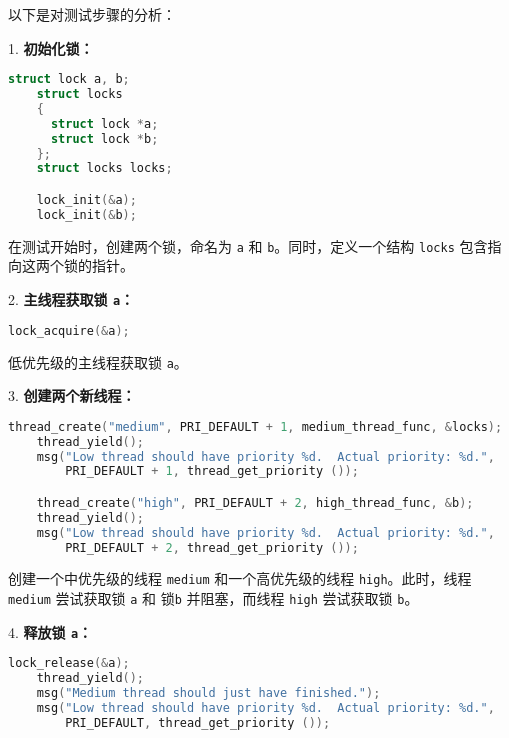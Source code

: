 \documentclass{beamer}
\begin{document}
\begin{frame}
    
    
    
    
  \framebreak

  以下是对测试步骤的分析：

  1. \textbf{初始化锁：}
  \begin{lstlisting}[language=C]
    struct lock a, b;
    struct locks 
    {
      struct lock *a;
      struct lock *b;
    };
    struct locks locks;

    lock_init(&a);
    lock_init(&b);
\end{lstlisting}

  在测试开始时，创建两个锁，命名为 \texttt{a} 和 \texttt{b}。同时，定义一个结构 \texttt{locks} 包含指向这两个锁的指针。

  2. \textbf{主线程获取锁 \texttt{a}：}
  \begin{lstlisting}[language=C]
    lock_acquire(&a);
\end{lstlisting}

  低优先级的主线程获取锁 \texttt{a}。

  3. \textbf{创建两个新线程：}
  \begin{lstlisting}[language=C]
    thread_create("medium", PRI_DEFAULT + 1, medium_thread_func, &locks);
    thread_yield();
    msg("Low thread should have priority %d.  Actual priority: %d.",
        PRI_DEFAULT + 1, thread_get_priority ());

    thread_create("high", PRI_DEFAULT + 2, high_thread_func, &b);
    thread_yield();
    msg("Low thread should have priority %d.  Actual priority: %d.",
        PRI_DEFAULT + 2, thread_get_priority ());
\end{lstlisting}

  创建一个中优先级的线程 \texttt{medium} 和一个高优先级的线程 \texttt{high}。此时，线程 \texttt{medium} 尝试获取锁 \texttt{a} 和 锁\texttt{b} 并阻塞，而线程 \texttt{high} 尝试获取锁 \texttt{b}。

  4. \textbf{释放锁 \texttt{a}：}
  \begin{lstlisting}[language=C]
    lock_release(&a);
    thread_yield();
    msg("Medium thread should just have finished.");
    msg("Low thread should have priority %d.  Actual priority: %d.",
        PRI_DEFAULT, thread_get_priority ());
\end{lstlisting}


\end{frame}
\end{document}
